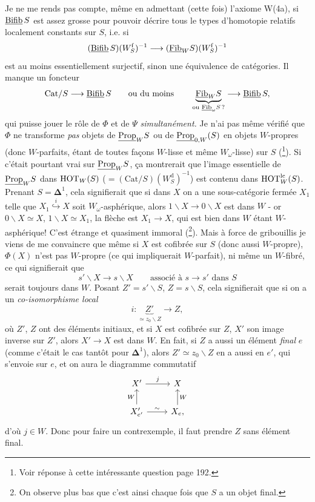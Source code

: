 Je ne me rends pas compte, même en admettant (cette fois) l'axiome W(4a), si $\underline{\mathrm{Bifib}}\, S$ est assez grosse pour pouvoir décrire tous le types d'homotopie relatifs localement constants sur $S$, i.e. si %
\[ (\underline{\mathrm{Bifib}}\, S)(W^{\mathrm{f}}_S)^{-1} \longrightarrow (\underline{\mathrm{Fib}}_W S)(W^{\mathrm{f}}_S)^{-1} \]
est au moins essentiellement surjectif, sinon une équivalence de catégories. Il manque un foncteur
\[ \mathrm{Cat}/S \longrightarrow \underline{\mathrm{Bifib}}\, S \qquad \text{ou du moins} \qquad \underbrace{\underline{\mathrm{Fib}}_W S}_{\text{ou $\underline{\mathrm{Fib}}_\omega S$\,?}} \longrightarrow \underline{\mathrm{Bifib}}\, S, \]
qui puisse jouer le rôle de $\Phi$ et de $\Psi$ \textit{simultanément.} Je n'ai pas même vérifié que $\Phi$ ne transforme \textit{pas} objets de $\underline{\mathrm{Prop}}_W S$ ou de $\underline{\mathrm{Prop}}_{0,W}(S)$ en objets $W$-propres (donc $W$-parfaits, étant de toutes façons $W$-lisse et même $W_\omega$-lisse) sur $S$ (\footnote{Voir réponse à cette intéressante question page 192.}). Si c'était pourtant vrai sur $\underline{\mathrm{Prop}}_W S$, ça montrerait que l'image essentielle de $\underline{\mathrm{Prop}}_W S$ dans $\mathrm{HOT}_W(S)$ ($= (\mathrm{Cat}/S)(W^{\mathrm{d}}_S)^{-1}$) est contenu dans $\mathrm{HOT}^{\mathrm{lc}}_W(S)$. %
Prenant $S = \mathbf{\Delta}^1$, cela signifierait que si dans $X$ on a une sous-catégorie fermée $X_1$ telle que $X_1 \overset{i}{\hookrightarrow} X$ soit $W_\omega$-asphérique, alors $1\backslash X \longrightarrow 0\backslash X$ est dans $W$ - or $0\backslash X \simeq X$, $1\backslash X \simeq X_1$, la flèche est $X_1 \longrightarrow X$, qui est bien dans $W$ étant $W$-asphérique! C'est étrange et quasiment immoral (\footnote{On observe plus bas que c'est ainsi chaque fois que $S$ a un objet final.}). Mais à force de gribouillis je viens de me convaincre que même si $X$ est cofibrée sur $S$ (donc aussi $W$-propre), $\Phi(X)$ n'est pas $W$-propre (ce qui impliquerait $W$-parfait), ni
même un $W$-fibré, ce qui signifierait que
\[ s'\backslash X \longrightarrow s\backslash X \qquad \text{associé à } s \longrightarrow s' \text{ dans } S \]
serait toujours dans $W$. Posant $Z' = s'\backslash S$, $Z = s\backslash S$, cela signifierait que si on a un \textit{co-isomorphisme local}
\[ i : \underbrace{Z'}_{\simeq z_0\backslash Z} \longrightarrow Z, \]
où $Z'$, $Z$ ont des éléments initiaux, et si $X$ est cofibrée sur $Z$, $X'$ son image inverse sur $Z'$, alors $X' \longrightarrow X$ est dans $W$. En fait, si $Z$ a aussi un élément \textit{final} $e$ (comme c'était le cas tantôt pour $\mathbf{\Delta}^1$), alors $Z' \simeq z_0\backslash Z$ en a aussi en $e'$, qui s'envoie sur $e$, et on aura le diagramme commutatif
\[
\begin{tikzcd}
X' \arrow[r, "j"] & X \\
X'_{e'} \arrow[u, "W"] \arrow[r, "\sim"] & X_e, \arrow[u, "W"']
\end{tikzcd}
\]
d'où $j \in W$. Donc pour faire un contrexemple,
il faut prendre $Z$ sans élément final.

